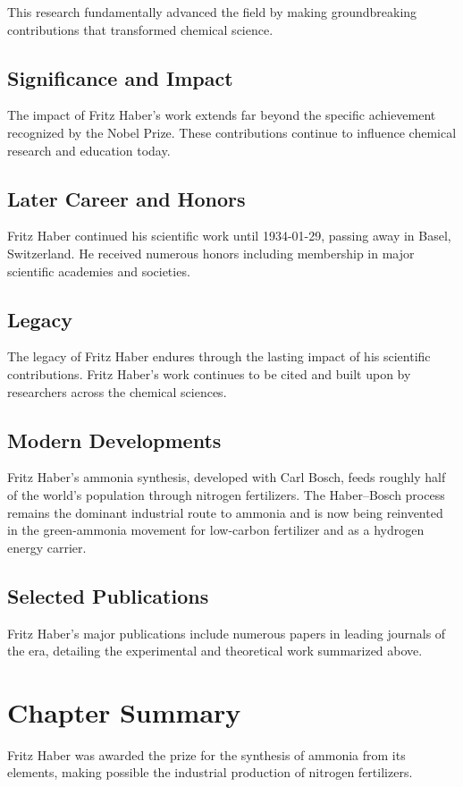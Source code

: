 This research fundamentally advanced the field by making groundbreaking contributions that transformed chemical science.

\subsection*{Significance and Impact}

The impact of Fritz Haber's work extends far beyond the specific achievement recognized by the Nobel Prize.
These contributions continue to influence chemical research and education today.

\subsection*{Later Career and Honors}

Fritz Haber continued his scientific work until 1934-01-29, passing away in Basel, Switzerland.
He received numerous honors including membership in major scientific academies and societies.

\subsection*{Legacy}

The legacy of Fritz Haber endures through the lasting impact of his scientific contributions.
Fritz Haber's work continues to be cited and built upon by researchers across the chemical sciences.

\subsection*{Modern Developments}

Fritz Haber's ammonia synthesis, developed with Carl Bosch, feeds roughly half of the world's population through nitrogen fertilizers. The Haber–Bosch process remains the dominant industrial route to ammonia and is now being reinvented in the green-ammonia movement for low-carbon fertilizer and as a hydrogen energy carrier.

\subsection*{Selected Publications}

Fritz Haber's major publications include numerous papers in leading journals of the era, detailing the experimental and theoretical work summarized above.

\clearpage

\section*{Chapter Summary}

Fritz Haber was awarded the prize for the synthesis of ammonia from its elements, making possible the industrial production of nitrogen fertilizers.
